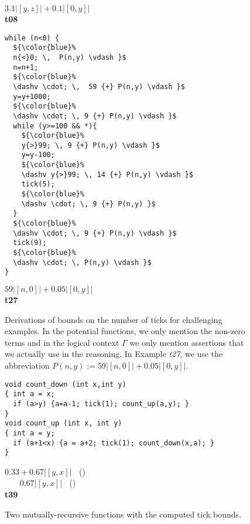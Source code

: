\documentclass[nocopyrightspace,preprint]{sigplanconf}
\begin{document}
\begin{figure*}[t!]
\begin{minipage}[b]{\progwidth}
\begin{center}
$3.1|[y,z]| + 0.1|[0,y]|$
\\[.7\baselineskip] 
      {\bf t08}
    \end{center}
  \end{minipage}
%
\hfill
%
%
%
  \begin{minipage}[b]{\progwidth}
    \begin{center}
   \begin{lstlisting}
while (n<0) {
  ${\color{blue}%
  n{<}0; \,  P(n,y) \vdash }$
  n=n+1;
  ${\color{blue}%
  \dashv \cdot; \,  59 {+} P(n,y) \vdash }$
  y=y+1000;
  ${\color{blue}%
  \dashv \cdot; \, 9 {+} P(n,y) \vdash }$
  while (y>=100 && *){
    ${\color{blue}%
    y{>}99; \, 9 {+} P(n,y) \vdash }$
    y=y-100;
    ${\color{blue}%
    \dashv y{>}99; \, 14 {+} P(n,y) \vdash }$
    tick(5);
    ${\color{blue}%
    \dashv \cdot; \, 9 {+} P(n,y) }$
  }
  ${\color{blue}%
  \dashv \cdot; \, 9 {+} P(n,y) \vdash }$
  tick(9);
  ${\color{blue}%
  \dashv \cdot; \, P(n,y) \vdash }$
}
   \end{lstlisting}
$59|[n,0]| {+} 0.05|[0,y]|$
\\[.7\baselineskip]
      {\bf t27}
    \end{center}
  \end{minipage}

  \caption{Derivations of bounds on the number of ticks for
    challenging examples.  In the potential functions, we only mention
    the non-zero terms and in the logical context $\Gamma$ we only
    mention assertions that we actually use in the reasoning. In
    Example \emph{t27}, we use the abbreviation $P(n,y) := 59|[n,0]|
    {+} 0.05|[0,y]|$.}
  \label{fig:ex_list}
\end{figure*}


\begin{figure}[t]
  \centering
    \begin{minipage}[b]{\linewidth}
    \begin{center}
   \begin{lstlisting}
void count_down (int x,int y)
{ int a = x;
  if (a>y) {a=a-1; tick(1); count_up(a,y); }
}
void count_up (int x, int y)
{ int a = y;
  if (a+1<x) {a = a+2; tick(1); count_down(x,a); }
}
   \end{lstlisting}

$0.33 + 0.67 |[y,x]|\;\;$ ()\\
$\;\;\;\;\;\;\,0.67 |[y,x]|\;\;$ ()
\\[.7\baselineskip]
      {\bf t39}
    \end{center}
  \end{minipage}
  \caption{Two mutually-recursive functions with the computed tick bounds.}
  \label{fig:ex_rec}
\end{figure}
\end{document}
